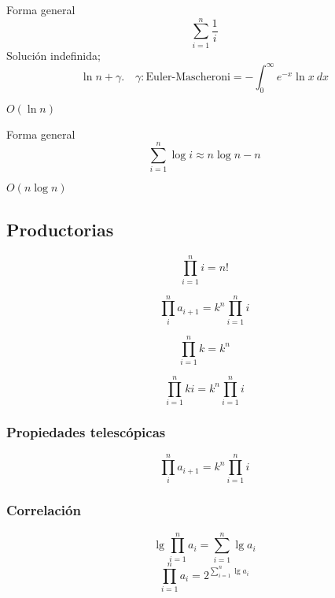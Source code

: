 \documentclass[tikz,11pt,fleqn]{book} %
\begin{document}
\begin{definition}[Armónica]
    Forma general
    $$ \sum_{i=1}^n\frac1i$$
    Solución indefinida;
    $$ \ln n+\gamma.\quad\gamma:\text{Euler-Mascheroni}=-\int_0^\infty e^{-x}\ln x~dx $$
    \begin{fact}[Orden]
        $O(\ln n)$
    \end{fact}
\end{definition}


\begin{definition}[Logarítmica]
    Forma general
    $$ \sum_{i=1}^n\log i \approx 
    n\log n-n$$
    \begin{fact}[Orden]
        $O(n\log n)$
    \end{fact}
\end{definition}

\subsection{Productorias}

\begin{definition}[Factorial]
    $$ 
        \prod_{i=1}^ni
        =n!
    $$
\end{definition}

\begin{definition}[Generalizada]
    $$ 
        \prod_{i}^n a_{i+1}
        =k^n\prod_{i=1}^ni
    $$
\end{definition}


\begin{definition}[Constante]
    $$ 
        \prod_{i=1}^nk
        =k^n
    $$
\end{definition}

\begin{definition}[Escalar]
    $$ 
        \prod_{i=1}^nki
        =k^n\prod_{i=1}^ni
    $$
\end{definition}

\subsubsection{Propiedades telescópicas}

\begin{definition}[Generalizada]
    $$ 
        \prod_{i}^n a_{i+1}
        =k^n\prod_{i=1}^ni
    $$
\end{definition}

\subsubsection{Correlación}
\begin{definition}
    $$
        \lg \prod_{i=1}^n a_i
        = \sum_{i=1}^n\lg a_i
    $$
    $$
        \prod_{i=1}^n a_i
        = 2^{\sum_{i=1}^n\lg a_i}
    $$
\end{definition}
\end{document}
